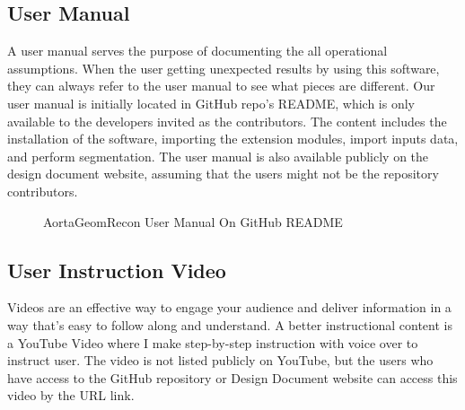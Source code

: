 \subsection{User Manual}
A user manual serves the purpose of documenting the all operational assumptions. When the user getting unexpected results by using this software, they can always refer to the user manual to see what pieces are different. Our user manual is initially located in GitHub repo's README, which is only available to the developers invited as the contributors. The content includes the installation of the software, importing the extension modules, import inputs data, and perform segmentation. The user manual is also available publicly on the design document website, assuming that the users might not be the repository contributors.

\begin{figure}[H]
    \centering
    \caption[AortaGeomRecon User Manual On GitHub README]{AortaGeomRecon User Manual On GitHub README}
    \label{fig_agr_git_um}
\end{figure}


\subsection{User Instruction Video}
Videos are an effective way to engage your audience and deliver information in a way that's easy to follow along and understand. A better instructional content is a YouTube Video where I make step-by-step instruction with voice over to instruct user. The video is not listed publicly on YouTube, but the users who have access to the GitHub repository or Design Document website can access this video by the URL link.

